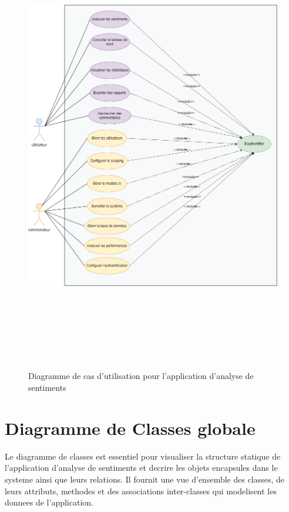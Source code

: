 \begin{figure}[H]
\centering
\includegraphics[height=20cm , width=\textwidth]{assets/images/usecase.png}
\caption{Diagramme de cas d'utilisation pour l'application d'analyse de sentiments}
\label{fig:usecase-global}
\end{figure}

\section{Diagramme de Classes globale}

Le diagramme de classes est essentiel pour visualiser la structure statique de l'application d'analyse de sentiments et decrire les objets encapsules dans le systeme ainsi que leurs relations. Il fournit une vue d'ensemble des classes, de leurs attributs, methodes et des associations inter-classes qui modelisent les donnees de l'application.

